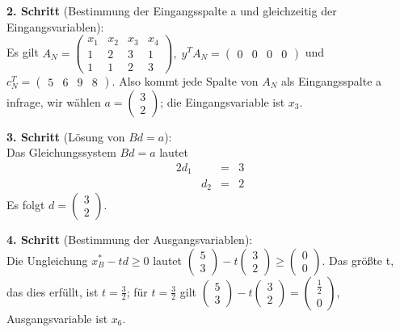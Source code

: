 \documentclass[10pt,a4paper,oneside,ngerman,numbers=noenddot]{scrartcl}
\begin{document}
		\textbf{2. Schritt} (Bestimmung der Eingangsspalte a und gleichzeitig der Eingangsvariablen):\\
		Es gilt $A_{N} = \begin{pmatrix} x_{1} & x_{2} & x_{3} & x_{4} \\ 1 & 2 & 3 & 1 \\ 1 & 1 & 2 & 3 \end{pmatrix},\; y^{T}A_{N} = \begin{pmatrix} 0 & 0 & 0 & 0\end{pmatrix}$ und $c_{N}^{T} = \begin{pmatrix} 5 & 6 & 9 & 8 \end{pmatrix}$. Also kommt jede Spalte von $A_{N}$ als Eingangsspalte a infrage, wir wählen $a = \begin{pmatrix} 3 \\ 2 \end{pmatrix}$; die Eingangsvariable ist $x_{3}$.
		
		\textbf{3. Schritt} (Lösung von $Bd = a$):\\
		Das Gleichungssystem $Bd = a$ lautet
		\begin{alignat*}{2}
			d_{1} & &=& 3 \\
			& d_{2} &=& 2
		\end{alignat*}
		Es folgt $d = \begin{pmatrix}3 \\ 2 \end{pmatrix}$.
		
		\textbf{4. Schritt} (Bestimmung der Ausgangsvariablen):\\
		Die Ungleichung $x_{B}^{*} - td \geq 0$ lautet $\begin{pmatrix} 5 \\ 3 \end{pmatrix} - t \begin{pmatrix}3 \\ 2 \end{pmatrix} \geq \begin{pmatrix} 0 \\ 0 \end{pmatrix}$. Das größte t, das dies erfüllt, ist $t = \frac{3}{2}$; für $t = \frac{3}{2}$ gilt $\begin{pmatrix} 5 \\ 3 \end{pmatrix} - t \begin{pmatrix}3 \\ 2 \end{pmatrix} = \begin{pmatrix} \frac{1}{2} \\ 0 \end{pmatrix}$, Ausgangsvariable ist $x_{6}$.
		
\end{document}
